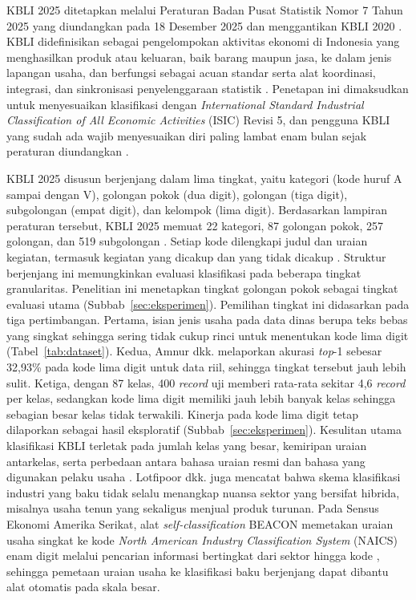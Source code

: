 KBLI 2025 ditetapkan melalui Peraturan Badan Pusat Statistik Nomor 7 Tahun 2025 yang diundangkan pada 18 Desember 2025 dan menggantikan KBLI 2020 \cite{bps2025perban7}. KBLI didefinisikan sebagai pengelompokan aktivitas ekonomi di Indonesia yang menghasilkan produk atau keluaran, baik barang maupun jasa, ke dalam jenis lapangan usaha, dan berfungsi sebagai acuan standar serta alat koordinasi, integrasi, dan sinkronisasi penyelenggaraan statistik \cite{bps2025perban7}. Penetapan ini dimaksudkan untuk menyesuaikan klasifikasi dengan \textit{International Standard Industrial Classification of All Economic Activities} (ISIC) Revisi 5, dan pengguna KBLI yang sudah ada wajib menyesuaikan diri paling lambat enam bulan sejak peraturan diundangkan \cite{bps2025perban7}.

KBLI 2025 disusun berjenjang dalam lima tingkat, yaitu kategori (kode huruf A sampai dengan V), golongan pokok (dua digit), golongan (tiga digit), subgolongan (empat digit), dan kelompok (lima digit). Berdasarkan lampiran peraturan tersebut, KBLI 2025 memuat 22 kategori, 87 golongan pokok, 257 golongan, dan 519 subgolongan \cite{bps2025perban7}.
Setiap kode dilengkapi judul dan uraian kegiatan, termasuk kegiatan yang dicakup dan yang tidak dicakup \cite{bps2025perban7}. Struktur berjenjang ini memungkinkan evaluasi klasifikasi pada beberapa tingkat granularitas. Penelitian ini menetapkan tingkat golongan pokok sebagai tingkat evaluasi utama (Subbab~\ref{sec:eksperimen}). Pemilihan tingkat ini didasarkan pada tiga pertimbangan. Pertama, isian jenis usaha pada data dinas berupa teks bebas yang singkat sehingga sering tidak cukup rinci untuk menentukan kode lima digit (Tabel~\ref{tab:dataset}). Kedua, Amnur dkk. \cite{amnur2025kbli} melaporkan akurasi \textit{top}-1 sebesar 32,93\% pada kode lima digit untuk data riil, sehingga tingkat tersebut jauh lebih sulit. Ketiga, dengan 87 kelas, 400 \textit{record} uji memberi rata-rata sekitar 4,6 \textit{record} per kelas, sedangkan kode lima digit memiliki jauh lebih banyak kelas sehingga sebagian besar kelas tidak terwakili. Kinerja pada kode lima digit tetap dilaporkan sebagai hasil eksploratif (Subbab~\ref{sec:eksperimen}).
Kesulitan utama klasifikasi KBLI terletak pada jumlah kelas yang besar, kemiripan uraian antarkelas, serta perbedaan antara bahasa uraian resmi dan bahasa yang digunakan pelaku usaha \cite{amnur2025kbli}. Lotfipoor dkk. \cite{lotfipoor2026llm} juga mencatat bahwa skema klasifikasi industri yang baku tidak selalu menangkap nuansa sektor yang bersifat hibrida, misalnya usaha tenun yang sekaligus menjual produk turunan. Pada Sensus Ekonomi Amerika Serikat, alat \textit{self-classification} BEACON memetakan uraian usaha singkat ke kode \textit{North American Industry Classification System} (NAICS) enam digit melalui pencarian informasi bertingkat dari sektor hingga kode \cite{dumbacher2025beacon}, sehingga pemetaan uraian usaha ke klasifikasi baku berjenjang dapat dibantu alat otomatis pada skala besar.

